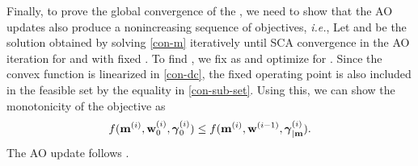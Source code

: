 Finally, to prove the global convergence of the , we need to show that the \ac{AO} updates also produce a nonincreasing sequence of objectives, \textit{i.e.}, 
\iftoggle{single_column}{
\begin{equation}
f(\iter{\mx}{\lpoint}{i},\iter{\my}{0}{i},\iter{\mz}{0}{i}) \leq f(\iter{\mx}{\lpoint}{i},\iter{\my}{\lpoint}{i-1},\iter{\mz}{\lpoint|\my}{i}).
\end{equation}}{
\begin{equation}
f(\iter{\mx}{\lpoint}{i},\iter{\my}{0}{i},\iter{\mz}{0}{i}) \leq f(\iter{\mx}{\lpoint}{i},\iter{\my}{\lpoint}{i-1},\iter{\mz}{\lpoint|\my}{i}).
\end{equation}}
Let  and  be the solution obtained by solving \eqref{con-m} iteratively until \ac{SCA} convergence in the  \ac{AO} iteration for \eqn{\mx} and \eqn{\mz} with fixed . To find , we fix \eqn{\mx} as  and optimize for \me{\my}. Since the convex function is linearized in \eqref{con-dc}, the fixed operating point is also included in the feasible set  by the equality in \eqref{con-sub-set}. Using this, we can show the monotonicity of the objective as
\begin{equation} \label{fixed_point}
f(\iter{\mx}{\lpoint}{i},\iter{\my}{0}{i},\iter{\mz}{0}{i}) \leq f(\iter{\mx}{\lpoint}{i},\iter{\my}{\lpoint}{i-1},\iter{\mz}{\lpoint|\mx}{i}).
\end{equation}
The \ac{AO} update follows .



